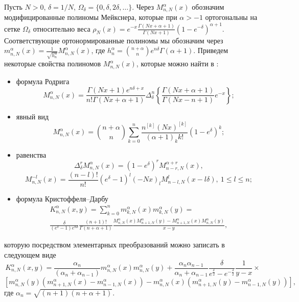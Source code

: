 Пусть $N>0$, $\delta=1/N$, $\Omega_\delta=\{0,\delta,2\delta,\ldots \}$. Через $M_{n,N}^{\alpha}(x)$ обозначим модифицированные полиномы Мейкснера, которые при $\alpha>-1$ ортогональны на сетке $\Omega_\delta$ относительно веса $\rho_N(x)=e^{-x}\frac{\Gamma(Nx+\alpha+1)}{\Gamma(Nx+1)}(1-e^{-\delta})^{\alpha+1}$. Соответствующие ортонормированные полиномы мы обозначим через $m_{n,N}^{\alpha}(x)=\frac{1}{\sqrt{h_n^\alpha}}M_{n,N}^{\alpha}(x)$, где $h_n^\alpha={\binom{n+\alpha}{n}}e^{n\delta}\Gamma(\alpha+1)$. Приведем некоторые свойства полиномов $M_{n,N}^{\alpha}(x)$, которые можно найти в \cite{Ram-SharBook}:
\begin{itemize}
\item
формула Родрига
\begin{equation}\label{Ram-for-Rod}
M_{n,N}^{\alpha}(x)=\frac{\Gamma(Nx+1)e^{n\delta+x}}{n!\Gamma(Nx+\alpha+1)}
\Delta^n_\delta\left\{\frac{\Gamma(Nx+\alpha+1)}
{\Gamma(Nx-n+1)}e^{-x}\right\};
\end{equation}
\item
явный вид
\begin{equation}\label{Ram-explicit-rep}
M_{n,N}^\alpha(x)={\binom{n+\alpha}{n}}\sum_{k=0}^n{\frac{n^{[k]}(Nx)^{[k]}}{(\alpha+1)_kk!}}\left(1-e^\delta\right)^k;
\end{equation}
\item
равенства
\begin{equation}\label{Ram-deriv}
\Delta_\delta^r M_{n,N}^{\alpha}(x)=(1-e^{\delta})^rM_{n-r,N}^{\alpha+r}(x),
\end{equation}
\begin{equation}\label{Ram-parametr-r}
M^{-l}_{n,N}(x)=\frac{(n-l)!}{n!}(e^\delta-1)^l(-Nx)_lM_{n-l,N}^l(x-l\delta),\ 1\le l\le n;
\end{equation}

\item
формула Кристоффеля--Дарбу
\begin{multline}\label{Ram-Kric-Dar}
K_{n,N}^{\alpha}(x,y)=\sum_{k=0}^n m_{k,N}^{\alpha}(x)m_{k,N}^{\alpha}(y)=\\
\frac{\delta}{(e^{\delta}-1)e^{n\delta}}\frac{(n+1)!}{\Gamma(n+\alpha+1)}\frac{M_{n,N}^\alpha(x)M_{n+1,N}^\alpha(y)-
M_{n+1,N}^\alpha(x)M_{n,N}^\alpha(y)}{x-y},
\end{multline}
\end{itemize}
которую посредством элементарных преобразований можно записать в следующем виде
$$
K_{n,N}^\alpha(x,y)={\frac{\alpha_n}{(\alpha_n+\alpha_{n-1})}}m_{n,N}^{\alpha}(x)m_{n,N}^{\alpha}(y)+
{\frac{\alpha_n\alpha_{n-1}}{\alpha_n+\alpha_{n-1}}}{\frac{\delta}{e^{\frac{\delta}{2}}-e^{-{\frac{\delta}{2}}}}} {\frac{1}{y-x}}\times
$$
$$
\left[m_{n,N}^\alpha(y)\left(m_{n+1,N}^\alpha(x)- m_{n-1,N}^\alpha(x)\right)
-m_{n,N}^\alpha(x)\left(m_{n+1,N}^\alpha(y)-m_{n-1,N}^\alpha(y)
\right)\right],
$$
где $\alpha_n=\sqrt{(n+1)(n+\alpha+1)}$.

